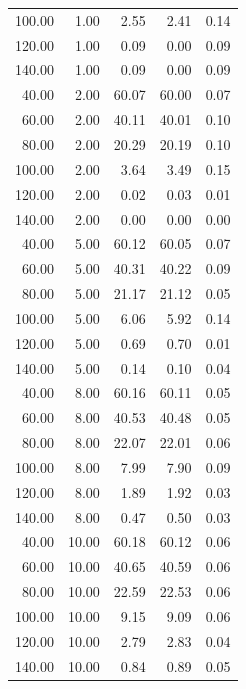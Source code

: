 \begin{longtable}{@{}rrrrr@{}}
100.00 & 1.00  & 2.55  & 2.41  & 0.14 \\
120.00 & 1.00  & 0.09  & 0.00  & 0.09 \\
140.00 & 1.00  & 0.09  & 0.00  & 0.09 \\
40.00  & 2.00  & 60.07 & 60.00 & 0.07 \\
60.00  & 2.00  & 40.11 & 40.01 & 0.10 \\
80.00  & 2.00  & 20.29 & 20.19 & 0.10 \\
100.00 & 2.00  & 3.64  & 3.49  & 0.15 \\
120.00 & 2.00  & 0.02  & 0.03  & 0.01 \\
140.00 & 2.00  & 0.00  & 0.00  & 0.00 \\
40.00  & 5.00  & 60.12 & 60.05 & 0.07 \\
60.00  & 5.00  & 40.31 & 40.22 & 0.09 \\
80.00  & 5.00  & 21.17 & 21.12 & 0.05 \\
100.00 & 5.00  & 6.06  & 5.92  & 0.14 \\
120.00 & 5.00  & 0.69  & 0.70  & 0.01 \\
140.00 & 5.00  & 0.14  & 0.10  & 0.04 \\
40.00  & 8.00  & 60.16 & 60.11 & 0.05 \\
60.00  & 8.00  & 40.53 & 40.48 & 0.05 \\
80.00  & 8.00  & 22.07 & 22.01 & 0.06 \\
100.00 & 8.00  & 7.99  & 7.90  & 0.09 \\
120.00 & 8.00  & 1.89  & 1.92  & 0.03 \\
140.00 & 8.00  & 0.47  & 0.50  & 0.03 \\
40.00  & 10.00 & 60.18 & 60.12 & 0.06 \\
60.00  & 10.00 & 40.65 & 40.59 & 0.06 \\
80.00  & 10.00 & 22.59 & 22.53 & 0.06 \\
100.00 & 10.00 & 9.15  & 9.09  & 0.06 \\
120.00 & 10.00 & 2.79  & 2.83  & 0.04 \\
140.00 & 10.00 & 0.84  & 0.89  & 0.05 \\
\end{longtable}
\endgroup

